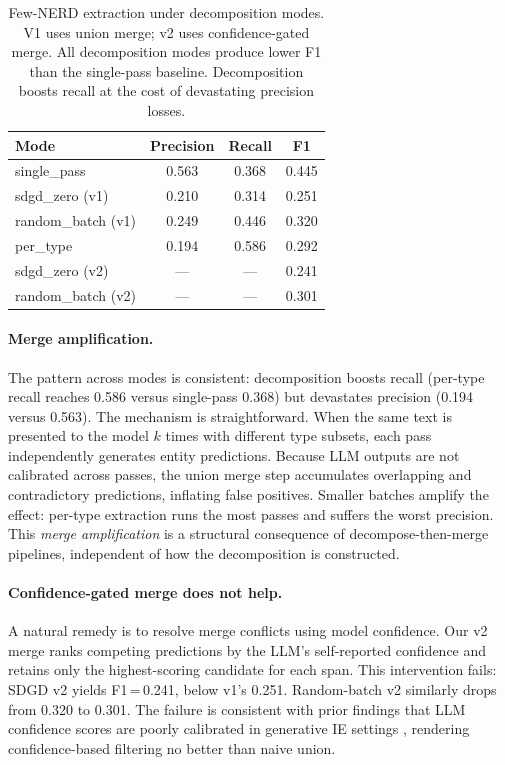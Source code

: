 \begin{table}[t]
\centering
\small
\begin{tabular}{lccc}
\toprule
\textbf{Mode} & \textbf{Precision} & \textbf{Recall} & \textbf{F1} \\
\midrule
single\_pass & 0.563 & 0.368 & 0.445 \\
\midrule
sdgd\_zero (v1) & 0.210 & 0.314 & 0.251 \\
random\_batch (v1) & 0.249 & 0.446 & 0.320 \\
per\_type & 0.194 & 0.586 & 0.292 \\
\midrule
sdgd\_zero (v2) & --- & --- & 0.241 \\
random\_batch (v2) & --- & --- & 0.301 \\
\bottomrule
\end{tabular}
\caption{Few-NERD extraction under decomposition modes.  V1 uses union merge; v2 uses confidence-gated merge.  All decomposition modes produce lower F1 than the single-pass baseline.  Decomposition boosts recall at the cost of devastating precision losses.}
\label{tab:sdgd_results}
\end{table}

\paragraph{Merge amplification.}
The pattern across modes is consistent: decomposition boosts recall (per-type recall reaches 0.586 versus single-pass 0.368) but devastates precision (0.194 versus 0.563).  The mechanism is straightforward.  When the same text is presented to the model $k$ times with different type subsets, each pass independently generates entity predictions.  Because LLM outputs are not calibrated across passes, the union merge step accumulates overlapping and contradictory predictions, inflating false positives.  Smaller batches amplify the effect: per-type extraction runs the most passes and suffers the worst precision.  This \emph{merge amplification} is a structural consequence of decompose-then-merge pipelines, independent of how the decomposition is constructed.

\paragraph{Confidence-gated merge does not help.}
A natural remedy is to resolve merge conflicts using model confidence.  Our v2 merge ranks competing predictions by the LLM's self-reported confidence and retains only the highest-scoring candidate for each span.  This intervention fails: SDGD v2 yields F1\,=\,0.241, below v1's 0.251.  Random-batch v2 similarly drops from 0.320 to 0.301.  The failure is consistent with prior findings that LLM confidence scores are poorly calibrated in generative IE settings \cite{llm-calibration-survey-2024}, rendering confidence-based filtering no better than naive union.

